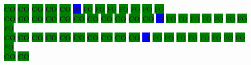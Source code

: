 \colorbox{green}{\color[rgb]{0,0,0}\textbf{CO}}%
\colorbox{green}{\color[rgb]{0,0,0}\textbf{CO}}%
\colorbox{green}{\color[rgb]{0,0,0}\textbf{CO}}%
\colorbox{green}{\color[rgb]{0,0,0}\textbf{CO}}%
\colorbox{green}{\color[rgb]{0,0,0}\textbf{CO}}%
\colorbox{blue}{\color[rgb]{1,0,0}\textbf{05}}%
\colorbox{green}{\color[gray]{0.75}FO}%
\colorbox{green}{\color[gray]{0.75}FO}%
\colorbox{green}{\color[gray]{0.75}FO}%
\colorbox{green}{\color[gray]{0.75}FO}%
\colorbox{green}{\color[gray]{0.75}FO}%
\colorbox{green}{\color[gray]{0.75}FO}%
\colorbox{green}{\color[gray]{0.75}FO}%
\\
\colorbox{green}{\color[rgb]{0,0,0}\textbf{CO}}%
\colorbox{green}{\color[rgb]{0,0,0}\textbf{CO}}%
\colorbox{green}{\color[rgb]{0,0,0}\textbf{CO}}%
\colorbox{green}{\color[rgb]{0,0,0}\textbf{CO}}%
\colorbox{green}{\color[rgb]{0,0,0}\textbf{CO}}%
\colorbox{green}{\color[rgb]{0,0,0}\textbf{CO}}%
\colorbox{green}{\color[rgb]{0,0,0}\textbf{CO}}%
\colorbox{green}{\color[rgb]{0,0,0}\textbf{CO}}%
\colorbox{green}{\color[rgb]{0,0,0}\textbf{CO}}%
\colorbox{green}{\color[rgb]{0,0,0}\textbf{CO}}%
\colorbox{green}{\color[rgb]{0,0,0}\textbf{CO}}%
\colorbox{blue}{\color[rgb]{1,0,0}\textbf{03}}%
\colorbox{green}{\color[gray]{0.75}FO}%
\colorbox{green}{\color[gray]{0.75}FO}%
\colorbox{green}{\color[gray]{0.75}FO}%
\colorbox{green}{\color[gray]{0.75}FO}%
\colorbox{green}{\color[gray]{0.75}FO}%
\colorbox{green}{\color[gray]{0.75}FO}%
\colorbox{green}{\color[gray]{0.75}FO}%
\colorbox{green}{\color[gray]{0.75}FO}%
\\
\colorbox{green}{\color[rgb]{0,0,0}\textbf{CO}}%
\colorbox{green}{\color[rgb]{0,0,0}\textbf{CO}}%
\colorbox{green}{\color[rgb]{0,0,0}\textbf{CO}}%
\colorbox{green}{\color[rgb]{0,0,0}\textbf{CO}}%
\colorbox{green}{\color[rgb]{0,0,0}\textbf{CO}}%
\colorbox{green}{\color[rgb]{0,0,0}\textbf{CO}}%
\colorbox{green}{\color[rgb]{0,0,0}\textbf{CO}}%
\colorbox{green}{\color[rgb]{0,0,0}\textbf{CO}}%
\colorbox{green}{\color[rgb]{0,0,0}\textbf{CO}}%
\colorbox{green}{\color[rgb]{0,0,0}\textbf{CO}}%
\colorbox{blue}{\color[rgb]{1,0,0}\textbf{01}}%
\colorbox{green}{\color[gray]{0.75}FO}%
\colorbox{green}{\color[gray]{0.75}FO}%
\colorbox{green}{\color[gray]{0.75}FO}%
\colorbox{green}{\color[gray]{0.75}FO}%
\colorbox{green}{\color[gray]{0.75}FO}%
\colorbox{green}{\color[gray]{0.75}FO}%
\colorbox{green}{\color[gray]{0.75}FO}%
\colorbox{green}{\color[gray]{0.75}FO}%
\colorbox{green}{\color[gray]{0.75}FO}%
\\
\colorbox{green}{\color[rgb]{0,0,0}\textbf{CO}}%
\colorbox{green}{\color[rgb]{0,0,0}\textbf{CO}}%
